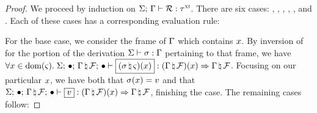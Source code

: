 \begin{proof}
  We proceed by induction on $\Sigma; \, \Gamma \vdash \mathcal{R} : \tau^\textsc{xi}$. There are six cases: ,
  , , ,
  , and . Each of these cases
  has a corresponding evaluation rule:

  \vspace{1em}
  \noindent \framebox[\textwidth]{
    \figuresize
    \begin{mathpar}
      \WFRefId \and \ERId
    \end{mathpar}
  }
  \vspace{1em}

  For the base case, we consider the frame of $\Gamma$ which contains
  $x$. By inversion of  for the portion of the
  derivation $\Sigma \vdash \sigma : \Gamma$ pertaining to
  that frame, we have $\forall \oxid \in \oxdomain{\oxstackframe}. \;
  \oxtypjudge{\oxglobalctx}{\oxemptyctx}{\oxemptyctx}{\oxnewframe{\oxvarctx}{\oxframe}}
  {(\oxnewframe{\oxstore}{\oxstackframe})(\oxid)}{
    (\oxnewframe{\oxvarctx}{\oxframe})(\oxid)
  }{\oxnewframe{\oxvarctx}{\oxframe}}$. Focusing on our particular $x$, we
  have both that $\sigma(x) = v$ and that
  $\oxtypjudge{\oxglobalctx}{\oxemptyctx}{\oxemptyctx}{\oxnewframe{\oxvarctx}{\oxframe}}
  {\oxvalue}{(\oxnewframe{\oxvarctx}{\oxframe})(\oxid)}{
    \oxnewframe{\oxvarctx}{\oxframe}
  }$, finishing the case. The remaining cases follow:

  \vspace{1em}

  \noindent \framebox[\textwidth]{
    \figuresize
    \begin{mathpar}
      \WFRefProj \and \ERProj
    \end{mathpar}
  }

  \vspace{1em}

  \noindent \framebox[\textwidth]{
    \figuresize
    \begin{mathpar}
      \WFRefIndexArray \and \ERIndexArray
    \end{mathpar}
  }

  \vspace{1em}

  \noindent \framebox[\textwidth]{
    \figuresize
    \begin{mathpar}
      \WFRefIndexSlice \and \ERIndexSlice
    \end{mathpar}
  }


\end{proof}
